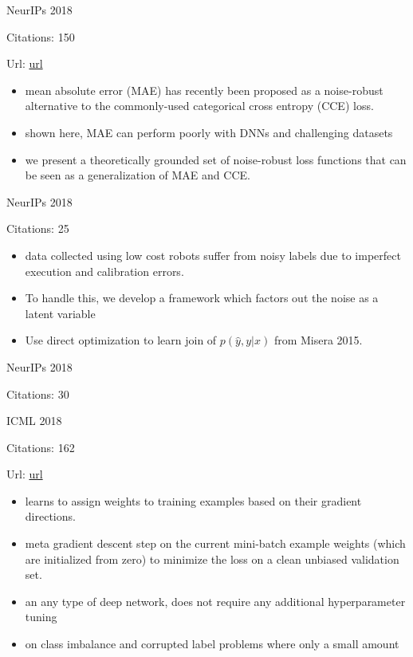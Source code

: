 \documentclass[11pt]{article}
\begin{document}
\noindent NeurIPs 2018

\noindent Citations: 150

\noindent Url: \href{https://papers.nips.cc/paper/8094-generalized-cross-entropy-loss-for-training-deep-neural-networks-with-noisy-labels.pdf}{url}

\begin{itemize}
\item mean absolute error (MAE) has recently been proposed as a noise-robust alternative to the commonly-used categorical cross entropy (CCE) loss.
\item shown here, MAE can perform poorly with DNNs and challenging datasets
\item we present a theoretically grounded set of noise-robust loss functions that can be seen as a generalization of MAE and CCE.
\end{itemize}

\vspace{2cm}

\noindent NeurIPs 2018

\noindent Citations: 25

\begin{itemize}
\item data collected using low cost robots suffer from noisy labels due to imperfect execution and calibration errors.
\item To handle this, we develop a framework which factors out the noise as a latent variable
\item Use direct optimization to learn join of $p(\hat{y},y|x)$ from Misera 2015.
\end{itemize}

\vspace{2cm}

\noindent NeurIPs 2018

\noindent Citations: 30

\vspace{2cm}

\noindent ICML 2018

\noindent Citations: 162

\noindent Url: \href{https://arxiv.org/pdf/1803.09050.pdf}{url}

\begin{itemize}
  \item learns to assign weights to training examples based on their gradient directions.
  \item meta gradient descent step on the current mini-batch example weights (which are initialized from zero) to minimize the loss on a clean unbiased validation set.
  \item an any type of deep network, does not require any additional hyperparameter tuning
  \item on class imbalance and corrupted label problems where only a small amount 
\end{itemize}
\end{document}
